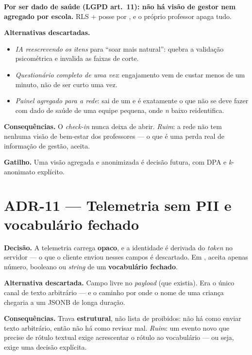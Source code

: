\textbf{Por ser dado de saúde (LGPD art.~11): não há visão de gestor nem agregado
por escola.} RLS + posse por , e o próprio professor apaga tudo.

\textbf{Alternativas descartadas.}
\begin{itemize}
  \item \emph{IA reescrevendo os itens} para \enquote{soar mais natural}:
    quebra a validação psicométrica e invalida as faixas de corte.
  \item \emph{Questionário completo de uma vez}: engajamento vem de custar menos
    de um minuto, não de ser curto uma vez.
  \item \emph{Painel agregado para a rede}: sai de um  e é
    exatamente o que não se deve fazer com dado de saúde de uma equipe pequena,
    onde \emph{n} baixo reidentifica.
\end{itemize}

\textbf{Consequências.} O \emph{check-in} nunca deixa de abrir. \emph{Ruim}: a
rede não tem nenhuma visão de bem-estar dos professores --- o que é uma perda
real de informação de gestão, aceita.

\textbf{Gatilho.} Uma visão agregada e anonimizada é decisão futura, com DPA e
\emph{k}-anonimato explícito.

\section{ADR-11 --- Telemetria sem PII e vocabulário fechado}

\textbf{Decisão.} A telemetria carrega  \textbf{opaco}, e a
identidade é derivada do \emph{token} no servidor --- o que o cliente enviou nesses
campos é descartado. Em ,  aceita
apenas número, booleano ou \emph{string} de um \textbf{vocabulário fechado}.

\textbf{Alternativa descartada.} Campo  livre no \emph{payload} (que
existia). Era o único canal de texto arbitrário --- e o caminho por onde o nome de
uma criança chegaria a um JSONB de longa duração.

\textbf{Consequências.} Trava \textbf{estrutural}, não lista de proibidos: não há
como enviar texto arbitrário, então não há como revisar mal. \emph{Ruim}: um
evento novo que precise de rótulo textual exige acrescentar o rótulo ao
vocabulário --- ou seja, exige uma decisão explícita.

